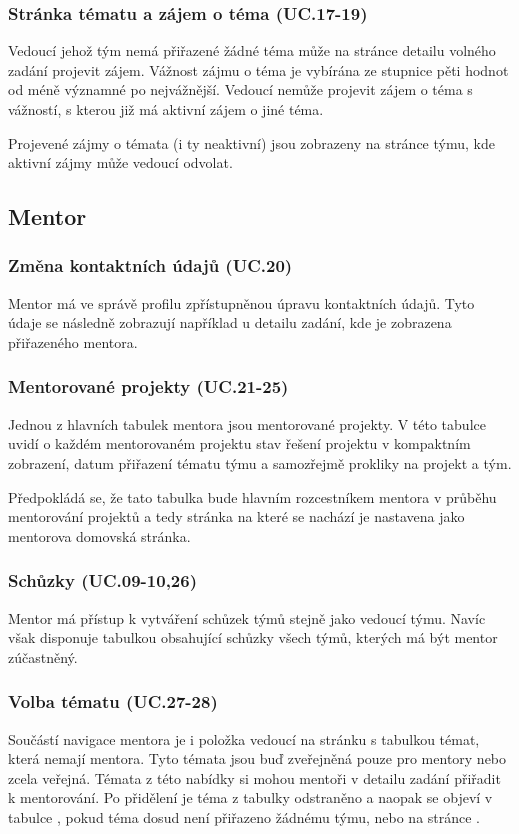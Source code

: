 \documentclass[czech,BP]{thesiskiv}
\begin{document}
			\subsubsection{Stránka tématu a zájem o téma (UC.17-19)}
				\par Vedoucí jehož tým nemá přiřazené žádné téma může na stránce detailu volného zadání projevit zájem. Vážnost zájmu o téma je vybírána ze stupnice pěti hodnot od méně významné po nejvážnější. Vedoucí nemůže projevit zájem o téma s vážností, s kterou již má aktivní zájem o jiné téma.
				\par Projevené zájmy o témata (i ty neaktivní) jsou zobrazeny na stránce týmu, kde aktivní zájmy může vedoucí odvolat.
		\subsection{Mentor}
			\subsubsection{Změna kontaktních údajů (UC.20)}
				\par Mentor má ve správě profilu zpřístupněnou úpravu kontaktních údajů. Tyto údaje se následně zobrazují například u detailu zadání, kde je zobrazena  přiřazeného mentora.
			\subsubsection{Mentorované projekty (UC.21-25)}
				\par Jednou z hlavních tabulek mentora jsou mentorované projekty. V této tabulce uvidí o každém mentorovaném projektu stav řešení projektu v kompaktním zobrazení, datum přiřazení tématu týmu a samozřejmě prokliky na projekt a tým.
				\par Předpokládá se, že tato tabulka bude hlavním rozcestníkem mentora v průběhu mentorování projektů a tedy stránka na které se nachází je nastavena jako mentorova domovská stránka.
			\subsubsection{Schůzky (UC.09-10,26)}
				\par Mentor má přístup k vytváření schůzek týmů stejně jako vedoucí týmu. Navíc však disponuje tabulkou obsahující schůzky všech týmů, kterých má být mentor zúčastněný.
			\subsubsection{Volba tématu (UC.27-28)}
				\par Součástí navigace mentora je i položka  vedoucí na stránku s tabulkou témat, která nemají mentora. Tyto témata jsou buď zveřejněná pouze pro mentory nebo zcela veřejná. Témata z této nabídky si mohou mentoři v detailu zadání přiřadit k mentorování. Po přidělení je téma z tabulky odstraněno a naopak se objeví v tabulce , pokud téma dosud není přiřazeno žádnému týmu, nebo na stránce .
\end{document}
